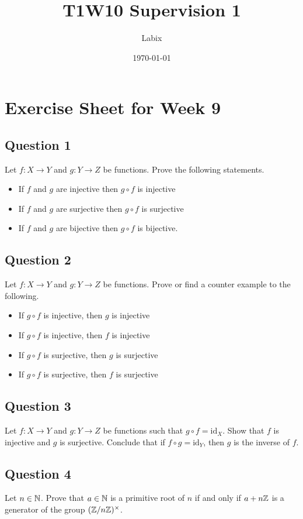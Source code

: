 \documentclass[a4paper]{article}
\title{T1W10 Supervision 1}
\author{Labix}
\date{\today}
\begin{document}
\section*{Exercise Sheet for Week 9}
\subsection*{Question 1}
Let $f:X\to Y$ and $g:Y\to Z$ be functions. Prove the following statements. 
\begin{itemize}
\item If $f$ and $g$ are injective then $g\circ f$ is injective
\item If $f$ and $g$ are surjective then $g\circ f$ is surjective
\item If $f$ and $g$ are bijective then $g\circ f$ is bijective. 
\end{itemize}

\subsection*{Question 2}
Let $f:X\to Y$ and $g:Y\to Z$ be functions. Prove or find a counter example to the following. 
\begin{itemize}
\item If $g\circ f$ is injective, then $g$ is injective
\item If $g\circ f$ is injective, then $f$ is injective
\item If $g\circ f$ is surjective, then $g$ is surjective
\item If $g\circ f$ is surjective, then $f$ is surjective
\end{itemize}

\subsection*{Question 3}
Let $f:X\to Y$ and $g:Y\to Z$ be functions such that $g\circ f=\text{id}_X$. Show that $f$ is injective and $g$ is surjective. Conclude that if $f\circ g=\text{id}_Y$, then $g$ is the inverse of $f$. 

\subsection*{Question 4}
Let $n\in\mathbb{N}$. Prove that $a\in\mathbb{N}$ is a primitive root of $n$ if and only if $a+n\mathbb{Z}$ is a generator of the group $(\mathbb{Z}/n\mathbb{Z})^\times$. 
\end{document}
